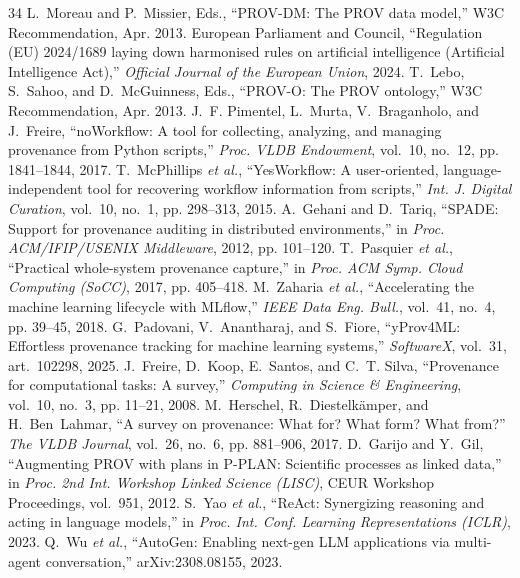 \documentclass[conference]{IEEEtran}
\begin{document}
\begin{thebibliography}{34}
 L.~Moreau and P.~Missier, Eds., ``PROV-DM: The PROV data model,'' W3C Recommendation, Apr. 2013.
 European Parliament and Council, ``Regulation (EU) 2024/1689 laying down harmonised rules on artificial intelligence (Artificial Intelligence Act),'' \emph{Official Journal of the European Union}, 2024.
 T.~Lebo, S.~Sahoo, and D.~McGuinness, Eds., ``PROV-O: The PROV ontology,'' W3C Recommendation, Apr. 2013.
 J.~F. Pimentel, L.~Murta, V.~Braganholo, and J.~Freire, ``noWorkflow: A tool for collecting, analyzing, and managing provenance from Python scripts,'' \emph{Proc. VLDB Endowment}, vol.~10, no.~12, pp. 1841--1844, 2017.
 T.~McPhillips \emph{et al.}, ``YesWorkflow: A user-oriented, language-independent tool for recovering workflow information from scripts,'' \emph{Int. J. Digital Curation}, vol.~10, no.~1, pp. 298--313, 2015.
 A.~Gehani and D.~Tariq, ``SPADE: Support for provenance auditing in distributed environments,'' in \emph{Proc. ACM/IFIP/USENIX Middleware}, 2012, pp. 101--120.
 T.~Pasquier \emph{et al.}, ``Practical whole-system provenance capture,'' in \emph{Proc. ACM Symp. Cloud Computing (SoCC)}, 2017, pp. 405--418.
 M.~Zaharia \emph{et al.}, ``Accelerating the machine learning lifecycle with MLflow,'' \emph{IEEE Data Eng. Bull.}, vol.~41, no.~4, pp. 39--45, 2018.
 G.~Padovani, V.~Anantharaj, and S.~Fiore, ``yProv4ML: Effortless provenance tracking for machine learning systems,'' \emph{SoftwareX}, vol.~31, art.~102298, 2025.
 J.~Freire, D.~Koop, E.~Santos, and C.~T. Silva, ``Provenance for computational tasks: A survey,'' \emph{Computing in Science \& Engineering}, vol.~10, no.~3, pp. 11--21, 2008.
 M.~Herschel, R.~Diestelk\"{a}mper, and H.~Ben~Lahmar, ``A survey on provenance: What for? What form? What from?'' \emph{The VLDB Journal}, vol.~26, no.~6, pp. 881--906, 2017.
 D.~Garijo and Y.~Gil, ``Augmenting PROV with plans in P-PLAN: Scientific processes as linked data,'' in \emph{Proc. 2nd Int. Workshop Linked Science (LISC)}, CEUR Workshop Proceedings, vol.~951, 2012.
 S.~Yao \emph{et al.}, ``ReAct: Synergizing reasoning and acting in language models,'' in \emph{Proc. Int. Conf. Learning Representations (ICLR)}, 2023.
 Q.~Wu \emph{et al.}, ``AutoGen: Enabling next-gen LLM applications via multi-agent conversation,'' arXiv:2308.08155, 2023.

\end{thebibliography}
\end{document}
